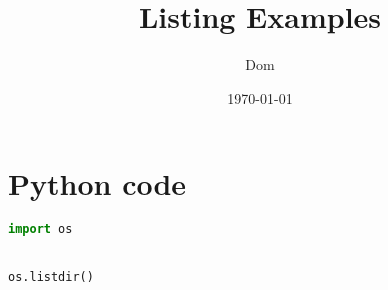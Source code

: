 \documentclass{article}
\title{Listing Examples}
\author{Dom}
\date{\today}
\begin{document}
\section{Python code}

\begin{lstlisting}[language=python]
import os


os.listdir()
\end{lstlisting}
\end{document}
